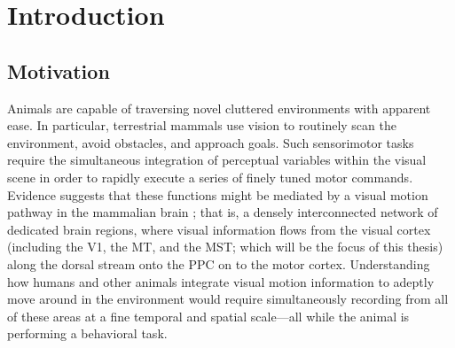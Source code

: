 \chapter{Introduction}

\section{Motivation}
\label{sec:intro|motivation}
Animals are capable of traversing novel cluttered environments with apparent ease.
In particular, terrestrial mammals use vision to routinely scan the environment, 
avoid obstacles, and approach goals.
Such sensorimotor tasks require the simultaneous integration 
of perceptual variables within the visual scene 
in order to rapidly execute a series of finely tuned motor commands.
Evidence suggests that these functions might be mediated 
by a visual motion pathway in the mammalian brain
\citep{Britten2008,Orban2008};
that is, a densely interconnected network of dedicated brain regions,
where visual information flows from
the visual cortex (including the \acf{V1}, the \acf{MT}, and the \acf{MST};
which will be the focus of this thesis)
along the dorsal stream onto the \acf{PPC} on to the motor cortex.
Understanding how humans and other animals integrate visual motion information
to adeptly move around in the environment 
would require simultaneously recording
from all of these areas at a fine temporal and spatial scale---all while the
animal is performing a behavioral task.

